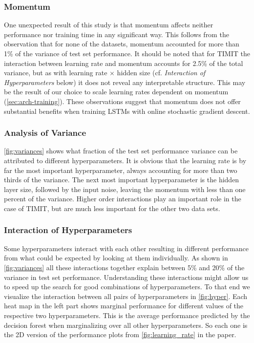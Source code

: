 \subsubsection*{Momentum}
One unexpected result of this study is that momentum affects neither performance nor training time in any significant way. This follows from the observation that for none of the datasets, momentum accounted for more than 1\% of the variance of test set performance. It should be noted that for TIMIT the interaction between learning rate and momentum accounts for 2.5\% of the total variance, but as with learning rate $\times$ hidden size (cf. \textit{Interaction of Hyperparameters} below) it does not reveal any interpretable structure. This may be the result of our choice to scale learning rates dependent on momentum (\autoref{sec:arch-training}).
These observations suggest that momentum does not offer substantial benefits when training LSTMs with online stochastic gradient descent. 

\subsubsection*{Analysis of Variance}

\autoref{fig:variances} shows what fraction of the test set performance variance can be attributed to different hyperparameters. It is obvious that the learning rate is by far the most important hyperparameter, always accounting for more than two thirds of the variance. The next most important hyperparameter is the hidden layer size, followed by the input noise, leaving the momentum with less than one percent of the variance. Higher order interactions play an important role in the case of TIMIT, but are much less important for the other two data sets. 

\subsubsection*{Interaction of Hyperparameters}

Some hyperparameters interact with each other resulting in different performance from what could be expected by looking at them individually. As shown in \autoref{fig:variances} all these interactions together explain between 5\% and 20\% of the variance in test set performance. Understanding these interactions might allow us to speed up the search for good combinations of hyperparameters. To that end we visualize the interaction between all pairs of hyperparameters in \autoref{fig:hyper}.
Each heat map in the left part shows marginal performance for different values of the respective two hyperparameters. This is the average performance predicted by the decision forest when marginalizing over all other hyperparameters. So each one is the 2D version of the performance plots from \autoref{fig:learning_rate} in the paper.

